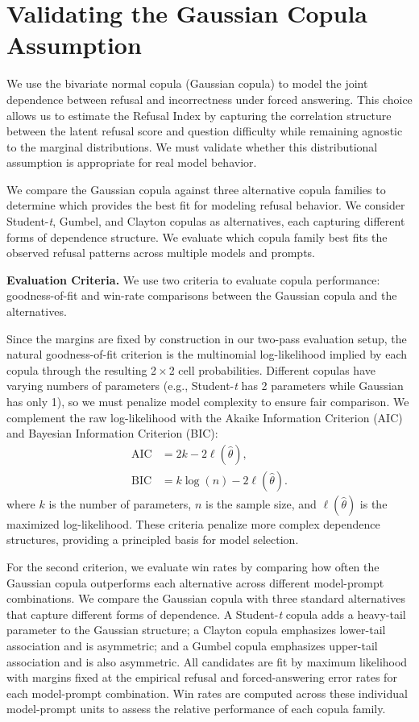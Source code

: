 \documentclass{article} %
\theoremstyle{definition}
\begin{document}
\section{Validating the Gaussian Copula Assumption}
\label{app:copula_validation}

We use the bivariate normal copula (Gaussian copula) to model the joint dependence between refusal and incorrectness under forced answering. This choice allows us to estimate the Refusal Index by capturing the correlation structure between the latent refusal score and question difficulty while remaining agnostic to the marginal distributions. We must validate whether this distributional assumption is appropriate for real model behavior.

We compare the Gaussian copula against three alternative copula families to determine which provides the best fit for modeling refusal behavior. We consider Student-\emph{t}, Gumbel, and Clayton copulas as alternatives, each capturing different forms of dependence structure. We evaluate which copula family best fits the observed refusal patterns across multiple models and prompts.


\noindent\textbf{Evaluation Criteria.}
We use two criteria to evaluate copula performance: goodness-of-fit and win-rate comparisons between the Gaussian copula and the alternatives.

Since the margins are fixed by construction in our two-pass evaluation setup, the natural goodness-of-fit criterion is the multinomial log-likelihood implied by each copula through the resulting 2\,$\times$\,2 cell probabilities. Different copulas have varying numbers of parameters (e.g., Student-\emph{t} has 2 parameters while Gaussian has only 1), so we must penalize model complexity to ensure fair comparison. We complement the raw log-likelihood with the Akaike Information Criterion (AIC) and Bayesian Information Criterion (BIC):
\begin{align}
\text{AIC} &= 2k - 2\ell(\hat{\theta}),\\
\text{BIC} &= k\log(n) - 2\ell(\hat{\theta}).
\end{align}
where $k$ is the number of parameters, $n$ is the sample size, and $\ell(\hat{\theta})$ is the maximized log-likelihood. These criteria penalize more complex dependence structures, providing a principled basis for model selection.

For the second criterion, we evaluate win rates by comparing how often the Gaussian copula outperforms each alternative across different model-prompt combinations. We compare the Gaussian copula with three standard alternatives that capture different forms of dependence. A Student-\emph{t} copula adds a heavy-tail parameter to the Gaussian structure; a Clayton copula emphasizes lower-tail association and is asymmetric; and a Gumbel copula emphasizes upper-tail association and is also asymmetric. All candidates are fit by maximum likelihood with margins fixed at the empirical refusal and forced-answering error rates for each model-prompt combination. Win rates are computed across these individual model-prompt units to assess the relative performance of each copula family.
\end{document}
